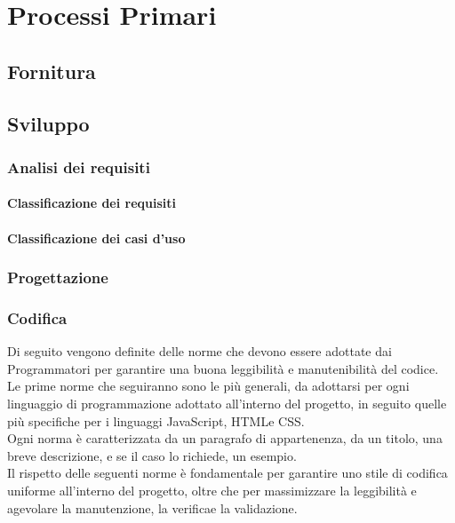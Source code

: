 \section{Processi Primari}

\subsection{Fornitura}

\subsection{Sviluppo}
\subsubsection{Analisi dei requisiti}
\paragraph{Classificazione dei requisiti}
\paragraph{Classificazione dei casi d'uso}

\subsubsection{Progettazione}
\subsubsection{Codifica}
Di seguito vengono definite delle norme che devono essere adottate dai Programmatori per garantire una buona leggibilità e manutenibilità del codice. Le prime norme che seguiranno sono le più generali, da adottarsi per ogni linguaggio di programmazione adottato all'interno del progetto, in seguito quelle più specifiche per i linguaggi JavaScript\glossario, HTML\glossario e CSS\glossario.\\
Ogni norma è caratterizzata da un paragrafo di appartenenza, da un titolo, una breve descrizione, e se il caso lo richiede, un esempio.\\
Il rispetto delle seguenti norme è fondamentale per garantire uno stile di codifica uniforme all'interno del progetto, oltre che per massimizzare la leggibilità e agevolare la manutenzione, la verifica\glossario e la validazione\glossario.

